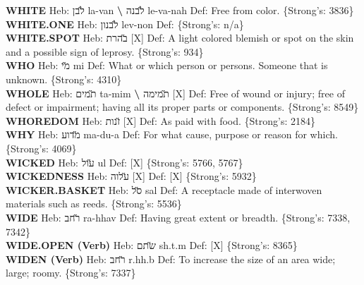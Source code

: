 {\textbf{WHITE} Heb: {\large\H לבן} la-van \textbf{\textbackslash{}} {\large\H לבנה} le-va-nah Def: Free from color. \{Strong's: 3836\}\hfill{}\\

\textbf{WHITE.ONE} Heb: {\large\H לבנון} lev-non Def: \{Strong's: n/a\}\hfill{}\\

\textbf{WHITE.SPOT} Heb: {\large\H בהרת} {[}X{]} Def: A light colored blemish or spot on the skin and a possible sign of leprosy. \{Strong's: 934\}\hfill{}\\

\textbf{WHO} Heb: {\large\H מי} mi Def: What or which person or persons. Someone that is unknown. \{Strong's: 4310\}\hfill{}\\

\textbf{WHOLE} Heb: {\large\H תמים} ta-mim \textbf{\textbackslash{}} {\large\H תמימה} {[}X{]} Def: Free of wound or injury; free of defect or impairment; having all its proper parts or components. \{Strong's: 8549\}\hfill{}\\

\textbf{WHOREDOM} Heb: {\large\H זנות} {[}X{]} Def: As paid with food. \{Strong's: 2184\}\hfill{}\\

\textbf{WHY} Heb: {\large\H מדוע} ma-du-a Def: For what cause, purpose or reason for which. \{Strong's: 4069\}\hfill{}\\

\textbf{WICKED} Heb: {\large\H עול} ul Def: {[}X{]} \{Strong's: 5766, 5767\}\hfill{}\\

\textbf{WICKEDNESS} Heb: {\large\H עלוה} {[}X{]} Def: {[}X{]} \{Strong's: 5932\}\hfill{}\\

\textbf{WICKER.BASKET} Heb: {\large\H סל} sal Def: A receptacle made of interwoven materials such as reeds. \{Strong's: 5536\}\hfill{}\\

\textbf{WIDE} Heb: {\large\H רחב} ra-hhav Def: Having great extent or breadth. \{Strong's: 7338, 7342\}\hfill{}\\

\textbf{WIDE.OPEN (Verb)} Heb: {\large\H שתם} sh.t.m Def: {[}X{]} \{Strong's: 8365\}\hfill{}\\

\textbf{WIDEN (Verb)} Heb: {\large\H רחב} r.hh.b Def: To increase the size of an area wide; large; roomy. \{Strong's: 7337\}\hfill{}\\

}
